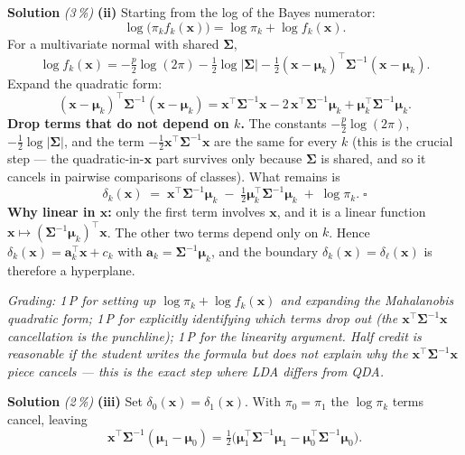 \documentclass[11pt,a4paper]{article}
\newcommand{\subpoints}[1]{\textit{(#1\,\%)}}
\newcommand{\sol}{\noindent\textbf{Solution}}
\begin{document}
\medskip
\sol{} \subpoints{3} \textbf{(ii)} Starting from the log of the Bayes numerator:
$$\log\bigl(\pi_k f_k(\mathbf{x})\bigr) = \log\pi_k + \log f_k(\mathbf{x}).$$
For a multivariate normal with shared $\boldsymbol\Sigma$,
$$\log f_k(\mathbf{x})
   = -\tfrac{p}{2}\log(2\pi) - \tfrac{1}{2}\log|\boldsymbol\Sigma|
     - \tfrac{1}{2}(\mathbf{x}-\boldsymbol\mu_k)^\top \boldsymbol\Sigma^{-1}(\mathbf{x}-\boldsymbol\mu_k).$$
Expand the quadratic form:
$$(\mathbf{x}-\boldsymbol\mu_k)^\top\boldsymbol\Sigma^{-1}(\mathbf{x}-\boldsymbol\mu_k)
  = \mathbf{x}^\top\boldsymbol\Sigma^{-1}\mathbf{x}
  - 2\,\mathbf{x}^\top\boldsymbol\Sigma^{-1}\boldsymbol\mu_k
  + \boldsymbol\mu_k^\top\boldsymbol\Sigma^{-1}\boldsymbol\mu_k.$$
\textbf{Drop terms that do not depend on $k$.} The constants
$-\tfrac{p}{2}\log(2\pi)$, $-\tfrac{1}{2}\log|\boldsymbol\Sigma|$, and the term
$-\tfrac{1}{2}\mathbf{x}^\top\boldsymbol\Sigma^{-1}\mathbf{x}$ are the same for every $k$
(this is the crucial step --- the quadratic-in-$\mathbf{x}$ part survives only because
$\boldsymbol\Sigma$ is shared, and so it cancels in pairwise comparisons of classes). What remains
is
$$\delta_k(\mathbf{x}) \;=\; \mathbf{x}^\top \boldsymbol\Sigma^{-1}\boldsymbol\mu_k
   \;-\; \tfrac{1}{2}\boldsymbol\mu_k^\top \boldsymbol\Sigma^{-1}\boldsymbol\mu_k
   \;+\; \log\pi_k.\;\square$$
\textbf{Why linear in $\mathbf{x}$:} only the first term involves $\mathbf{x}$, and it is a linear
function $\mathbf{x}\mapsto (\boldsymbol\Sigma^{-1}\boldsymbol\mu_k)^\top \mathbf{x}$. The other
two terms depend only on $k$. Hence $\delta_k(\mathbf{x})=\mathbf{a}_k^\top \mathbf{x} + c_k$
with $\mathbf{a}_k=\boldsymbol\Sigma^{-1}\boldsymbol\mu_k$, and the boundary
$\delta_k(\mathbf{x})=\delta_\ell(\mathbf{x})$ is therefore a hyperplane.

\noindent\emph{Grading: 1\,P for setting up $\log\pi_k+\log f_k(\mathbf{x})$ and expanding the
Mahalanobis quadratic form; 1\,P for explicitly identifying which terms drop out (the
$\mathbf{x}^\top\boldsymbol\Sigma^{-1}\mathbf{x}$ cancellation is the punchline); 1\,P for the
linearity argument. Half credit is reasonable if the student writes the formula but does not
explain why the $\mathbf{x}^\top\boldsymbol\Sigma^{-1}\mathbf{x}$ piece cancels --- this is the
exact step where LDA differs from QDA.}

\medskip
\sol{} \subpoints{2} \textbf{(iii)} Set $\delta_0(\mathbf{x})=\delta_1(\mathbf{x})$. With
$\pi_0=\pi_1$ the $\log\pi_k$ terms cancel, leaving
$$\mathbf{x}^\top\boldsymbol\Sigma^{-1}(\boldsymbol\mu_1-\boldsymbol\mu_0)
   = \tfrac{1}{2}\bigl(\boldsymbol\mu_1^\top\boldsymbol\Sigma^{-1}\boldsymbol\mu_1
                       - \boldsymbol\mu_0^\top\boldsymbol\Sigma^{-1}\boldsymbol\mu_0\bigr).$$
\end{document}
